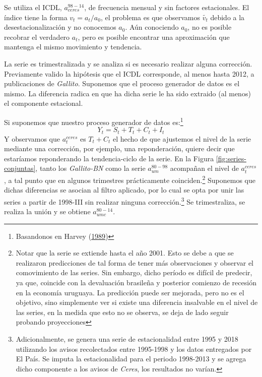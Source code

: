 \documentclass[12pt,oneside]{reedthesis}
\begin{document}
Se utiliza el ICDL, \(a_{ceres}^{98-14}\), de frecuencia mensual y sin factores estacionales. El índice tiene la forma \(v_t = a_t/a_0\), el problema es que observamos \(\tilde{v_t}\) debido a la desestacionalización y no conocemos \(a_0\). Aún conociendo \(a_0\), no es posible recobrar el verdadero \(a_t\), pero es posible encontrar una aproximación que mantenga el mismo movimiento y tendencia.

La serie es trimestralizada y se analiza si es necesario realizar alguna corrección. Previamente valido la hipótesis que el ICDL corresponde, al menos hasta 2012, a publicaciones de \emph{Gallito}. Suponemos que el proceso generador de datos es el mismo. La diferencia radica en que ha dicha serie le ha sido extraido (al menos) el componente estacional.

Si suponemos que nuestro proceso generador de datos es:\footnote{Basandonos en Harvey (\protect\hyperlink{ref-Harvey1989}{1989})}
\begin{equation}
Y_t = S_t + T_t + C_t + I_t
\end{equation}
Y observamos que \(a_t^{ceres}\) es \(T_t + C_t\) el hecho de que ajustemos el nivel de la serie mediante una corrección, por ejemplo, una reponderación, quiere decir que estaríamos reponderando la tendencia-ciclo de la serie. En la Figura \ref{fig:series-conjuntas}, tanto los \emph{Gallito-BN} como la serie \(a_{um}^{80-98}\) acompañan el nivel de \(a_t^{ceres}\), a tal punto que en algunos trimestres prácticamente coinciden.\footnote{Notar que la serie se extiende hasta el año 2001. Esto se debe a que se realizaron predicciones de tal forma de tener más observaciones y observar el comovimiento de las series. Sin embargo, dicho período es difícil de predecir, ya que, coincide con la devaluación brasileña y posterior comienzo de recesión en la economía uruguaya. La predicción puede ser mejorada, pero no es el objetivo, sino simplemente ver si existe una diferencia insalvable en el nivel de las series, en la medida que esto no se observa, se deja de lado seguir probando proyecciones} Suponemos que dichas diferencias se asocian al filtro aplicado, por lo cual se opta por unir las series a partir de 1998-III sin realizar ninguna corrección.\footnote{Adicionalmente, se genera una serie de estacionalidad entre 1995 y 2018 utilizando los avisos recolectados entre 1995-1998 y los datos entregados por El País. Se imputa la estacionalidad para el periodo 1998-2013 y se agrega dicho componente a los avisos de \emph{Ceres}, los resultados no varían.}
Se trimestraliza, se realiza la unión y se obtiene \(a_{umc}^{80-14}\).
\end{document}
